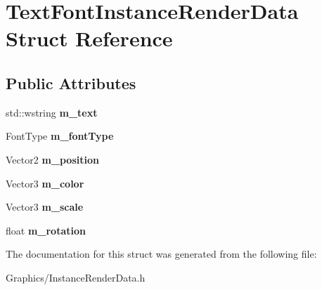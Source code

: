 \hypertarget{structTextFontInstanceRenderData}{}\section{Text\+Font\+Instance\+Render\+Data Struct Reference}
\label{structTextFontInstanceRenderData}
\subsection*{Public Attributes}
\begin{DoxyCompactItemize}
\item 
\mbox{\label{structTextFontInstanceRenderData_a765f775c7f59f1219c030b3467f91c84}} 
std\+::wstring {\bfseries m\+\_\+text}
\item 
\mbox{\label{structTextFontInstanceRenderData_a3550f6ec9d45790bba28dd9756a2bb26}} 
Font\+Type {\bfseries m\+\_\+font\+Type}
\item 
\mbox{\label{structTextFontInstanceRenderData_af9d2b4f6973192c8d58d2e3d381bf40e}} 
Vector2 {\bfseries m\+\_\+position}
\item 
\mbox{\label{structTextFontInstanceRenderData_ad73980872bede164d53e834986cfa6d7}} 
Vector3 {\bfseries m\+\_\+color}
\item 
\mbox{\label{structTextFontInstanceRenderData_af28a15d4445a522acf74abc4d74b57cb}} 
Vector3 {\bfseries m\+\_\+scale}
\item 
\mbox{\label{structTextFontInstanceRenderData_a5f62c25e57e828fe59ead2ebbc1dbdbb}} 
float {\bfseries m\+\_\+rotation}
\end{DoxyCompactItemize}


The documentation for this struct was generated from the following file\+:\begin{DoxyCompactItemize}
\item 
Graphics/Instance\+Render\+Data.\+h\end{DoxyCompactItemize}
